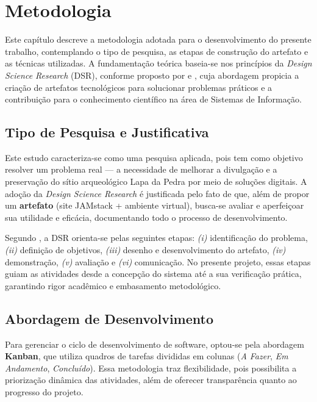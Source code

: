 \chapter{Metodologia}
\label{cap:metodologia}

Este capítulo descreve a metodologia adotada para o desenvolvimento do presente trabalho, contemplando o tipo de pesquisa, as etapas de construção do artefato e as técnicas utilizadas. A fundamentação teórica baseia-se nos princípios da \textit{Design Science Research} (DSR), conforme proposto por \cite{gregor2013positioning} e \citep{GregorHevner2013}, cuja abordagem propicia a criação de artefatos tecnológicos para solucionar problemas práticos e a contribuição para o conhecimento científico na área de Sistemas de Informação.

\section{Tipo de Pesquisa e Justificativa}
\label{sec:tipo_pesquisa}

Este estudo caracteriza-se como uma pesquisa aplicada, pois tem como objetivo resolver um problema real --- a necessidade de melhorar a divulgação e a preservação do sítio arqueológico Lapa da Pedra por meio de soluções digitais. A adoção da \textit{Design Science Research} é justificada pelo fato de que, além de propor um \textbf{artefato} (site JAMstack + ambiente virtual), busca-se avaliar e aperfeiçoar sua utilidade e eficácia, documentando todo o processo de desenvolvimento.

Segundo , a DSR orienta-se pelas seguintes etapas: \textit{(i)} identificação do problema, \textit{(ii)} definição de objetivos, \textit{(iii)} desenho e desenvolvimento do artefato, \textit{(iv)} demonstração, \textit{(v)} avaliação e \textit{(vi)} comunicação. No presente projeto, essas etapas guiam as atividades desde a concepção do sistema até a sua verificação prática, garantindo rigor acadêmico e embasamento metodológico.

\section{Abordagem de Desenvolvimento}
\label{sec:abordagem_desenvolvimento}

Para gerenciar o ciclo de desenvolvimento de software, optou-se pela abordagem \textbf{Kanban}, que utiliza quadros de tarefas divididas em colunas (\textit{A Fazer}, \textit{Em Andamento}, \textit{Concluído}). Essa metodologia traz flexibilidade, pois possibilita a priorização dinâmica das atividades, além de oferecer transparência quanto ao progresso do projeto.

